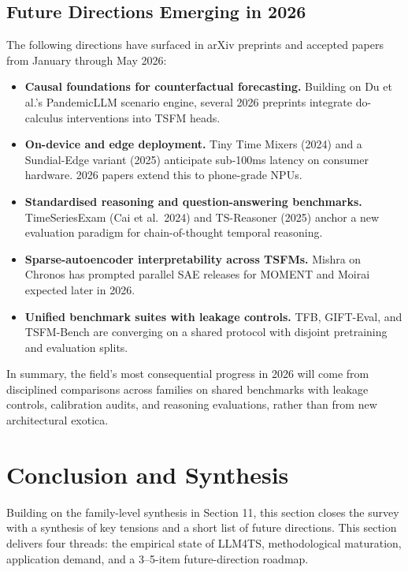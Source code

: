 \documentclass{article}
\begin{document}
\subsection{Future Directions Emerging in 2026}\label{future-directions-emerging-in-2026}

The following directions have surfaced in arXiv preprints and accepted papers from January through May 2026:

\begin{itemize}

\item
  \textbf{Causal foundations for counterfactual forecasting.} Building on Du et al.'s PandemicLLM scenario engine, several 2026 preprints integrate do-calculus interventions into TSFM heads.
\item
  \textbf{On-device and edge deployment.} Tiny Time Mixers (2024) and a Sundial-Edge variant (2025) anticipate sub-100ms latency on consumer hardware. 2026 papers extend this to phone-grade NPUs.
\item
  \textbf{Standardised reasoning and question-answering benchmarks.} TimeSeriesExam (Cai et al.~2024) and TS-Reasoner (2025) anchor a new evaluation paradigm for chain-of-thought temporal reasoning.
\item
  \textbf{Sparse-autoencoder interpretability across TSFMs.} Mishra \citet{mishra2026dissectingchronoss} on Chronos has prompted parallel SAE releases for MOMENT and Moirai expected later in 2026.
\item
  \textbf{Unified benchmark suites with leakage controls.} TFB, GIFT-Eval, and TSFM-Bench are converging on a shared protocol with disjoint pretraining and evaluation splits.
\end{itemize}

In summary, the field's most consequential progress in 2026 will come from disciplined comparisons across families on shared benchmarks with leakage controls, calibration audits, and reasoning evaluations, rather than from new architectural exotica.

\section{Conclusion and Synthesis}\label{conclusion-and-synthesis}

Building on the family-level synthesis in Section 11, this section closes the survey with a synthesis of key tensions and a short list of future directions. This section delivers four threads: the empirical state of LLM4TS, methodological maturation, application demand, and a 3--5-item future-direction roadmap.
\end{document}
